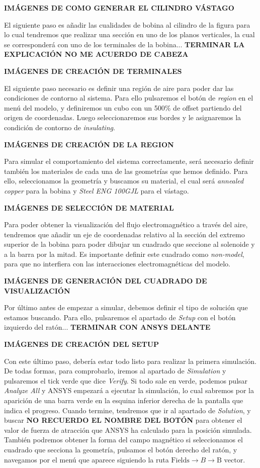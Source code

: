 \textbf{IMÁGENES DE COMO GENERAR EL CILINDRO VÁSTAGO}

El siguiente paso es añadir las cualidades de bobina al cilindro de la figura %
para lo cual tendremos que realizar una sección en uno de los planos verticales, la cual se corresponderá con uno de los terminales de la bobina... \textbf{TERMINAR LA EXPLICACIÓN NO ME ACUERDO DE CABEZA}

\textbf{IMÁGENES DE CREACIÓN DE TERMINALES}

El siguiente paso necesario es definir una región de aire para poder dar las condiciones de contorno al sistema. Para ello pulsaremos el botón de \textit{region} en el menú del modelo, y definiremos un cubo con un 500\% de offset partiendo del origen de coordenadas. Luego seleccionaremos sus bordes y le asignaremos la condición de contorno de \textit{insulating}.

\textbf{IMÁGENES DE CREACIÓN DE LA REGION}

Para simular el comportamiento del sistema correctamente, será necesario definir también los materiales de cada una de las geometrías que hemos definido. Para ello, seleccionamos la geometría y buscamos su material, el cual será \textit{annealed copper} para la bobina y \textit{Steel ENG 100GJL} para el vástago.

\textbf{IMÁGENES DE SELECCIÓN DE MATERIAL}

Para poder obtener la visualización del flujo electromagnético a través del aire, tendremos que añadir un eje de coordenadas relativo al la sección del extremo superior de la bobina para poder dibujar un cuadrado que seccione al solenoide y a la barra por la mitad. Es importante definir este cuadrado como \textit{non-model}, para que no interfiera con las interacciones electromagnéticas del modelo. 

\textbf{IMÁGENES DE GENERACIÓN DEL CUADRADO DE VISUALIZACIÓN}


Por último antes de empezar a simular, debemos definir el tipo de solución que estamos buscando. Para ello, pulsaremos el apartado de \textit{Setup} con el botón izquierdo del ratón... \textbf{TERMINAR CON ANSYS DELANTE}

\textbf{IMÁGENES DE CREACIÓN DEL SETUP}

Con este último paso, debería estar todo listo para realizar la primera simulación. De todas formas, para comprobarlo, iremos al apartado de \textit{Simulation} y pulsaremos el tick verde que dice \textit{Verify}. Si todo sale en verde, podemos pulsar \textit{Analyze All} y ANSYS empezará a ejecutar la simulación, lo cual sabremos por la aparición de una barra verde en la esquina inferior derecha de la pantalla que indica el progreso. Cuando termine, tendremos que ir al apartado de \textit{Solution}, y buscar \textbf{NO RECUERDO EL NOMBRE DEL BOTÓN} para obtener el valor de fuerza de atracción que ANSYS ha calculado para la posición simulada. También podremos obtener la forma del campo magnético si seleccionamos el cuadrado que secciona la geometría, pulsamos el botón derecho del ratón, y navegamos por el menú que aparece siguiendo la ruta \(\text{Fields} \rightarrow B \rightarrow \text{B vector}\).

